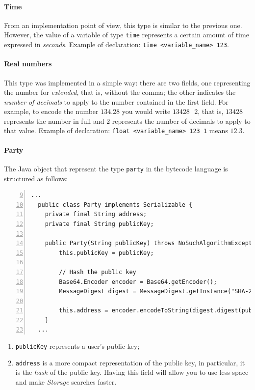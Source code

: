 \paragraph{Time}

From an implementation point of view, this type is similar to the previous one. However, the value of a 
variable of type \verb|time| represents a certain amount of time expressed in \textit{seconds}. Example 
of declaration: \verb|time <variable_name> 123|.

\paragraph{Real numbers}

This type was implemented in a simple way: there are two fields, one representing the number for 
\textit{extended}, that is, without the comma; the other indicates the \textit{number of decimals} to 
apply to the number contained in the first field. For example, to encode the number $134.28$ you would 
write $13428 \text{ } 2$, that is, $13428$ represents the number in full and $2$ represents the number of 
decimals to apply to that value. Example of declaration: \verb|float <variable_name> 123 1| means $12.3$.

\paragraph{Party}
\label{party-implementation}

The Java object that represent the type \verb|party| in the bytecode language is structured as follows:
\begin{Verbatim}[numbers=left,xleftmargin=1cm,firstnumber=9,breaklines=true,breakanywhere=true,tabsize=2]
  ...
  public class Party implements Serializable {
    private final String address;
    private final String publicKey;

    public Party(String publicKey) throws NoSuchAlgorithmException {
        this.publicKey = publicKey;

        // Hash the public key
        Base64.Encoder encoder = Base64.getEncoder();
        MessageDigest digest = MessageDigest.getInstance("SHA-256");

        this.address = encoder.encodeToString(digest.digest(publicKey.getBytes(StandardCharsets.UTF_8)));
    }
  ...
\end{Verbatim}
\begin{enumerate}
  \item \verb|publicKey| represents a user's public key;
  \item \verb|address| is a more compact representation of the public key, in particular, it is the 
  \textit{hash} of the public key. Having this field will allow you to use less space and make 
  \textit{Storage} searches faster.
\end{enumerate}

